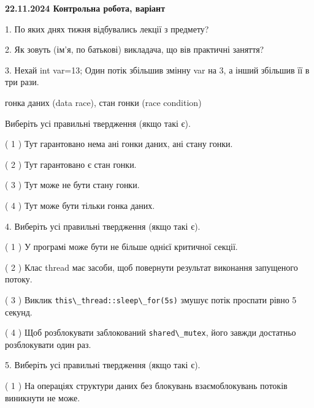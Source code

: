 \documentclass[12pt, ukrainian]{article}
\def\code#1{\Verb!#1!}
\begin{document}
\vspace{4mm}
\newpage
\begin {large}

\textbf{22.11.2024 Контрольна робота, варіант  }\par


{
1. По яких днях тижня відбувались лекції з предмету?



\vspace{5mm}
2. Як зовуть (ім'я, по батькові) викладача, що вів практичні заняття?



\vspace{5mm}
3. Нехай int var=13; Один потік збільшив змінну var на 3, а інший збільшив її в три рази.

гонка даних (data race), стан гонки (race condition)

Виберіть усі правильні твердження (якщо такі є).\par
\vspace{2mm}
( 1 ) Тут гарантовано нема ані гонки даних, ані стану гонки.%

( 2 ) Тут гарантовано є стан гонки.%

( 3 ) Тут може не бути стану гонки.%

( 4 ) Тут може бути тільки гонка даних.%


\vspace{5mm}
4. Виберіть усі правильні твердження (якщо такі є).\par
\vspace{2mm}

( 1 ) У програмі може бути не більше однієї критичної секції.%

( 2 ) Клас thread має засоби, щоб повернути результат виконання запущеного потоку.%

( 3 ) Виклик \code{this\_thread::sleep\_for(5s)} змушує потік проспати рівно 5 секунд.%

( 4 ) Щоб розблокувати заблокований \code{shared\_mutex}, його завжди достатньо розблокувати один раз.%


\vspace{5mm}
5. Виберіть усі правильні твердження (якщо такі є).\par
\vspace{2mm}

( 1 ) На операціях структури даних без блокувань взаємоблокувань потоків виникнути не може.%

}
\end{large}
\end{document}
